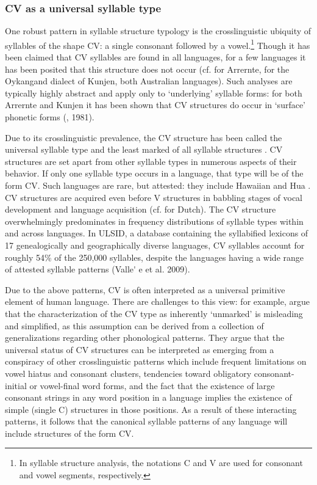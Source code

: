 \subsubsection{{CV} {as} {a} {universal} {syllable} {type}}\label{sec:1.1.2.1}

\textsf{} One robust pattern in syllable structure typology is the crosslinguistic ubiquity of syllables of the shape CV: a single consonant followed by a vowel.\footnote{{In syllable structure analysis, the notations C and V are used for consonant and vowel segments, respectively.}} Though it has been claimed that CV syllables are found in all languages, for a few languages it has been posited that this structure does not occur (cf. \citealt{BreenPensalfini1999} for Arrernte, \citealt{Sommer1969} for the Oykangand dialect of Kunjen, both Australian languages). Such analyses are typically highly abstract and apply only to ‘underlying’ syllable forms: for both Arrernte and Kunjen it has been shown that CV structures do occur in ‘surface’ phonetic forms (\citealt{Anderson2000,Sommer1969}, 1981).

  Due to its crosslinguistic prevalence, the CV structure has been called the universal syllable type and the least marked of all syllable structures \citep{Zec2007}. CV structures are set apart from other syllable types in numerous aspects of their behavior. If only one syllable type occurs in a language, that type will be of the form CV. Such languages are rare, but attested: they include Hawaiian \citep{Maddieson2011} and Hua \citep{Blevins1995}. CV structures are acquired even before V structures in babbling stages of vocal development and language acquisition (cf. \citealt{LeveltEtAl2000} for Dutch). The CV structure overwhelmingly predominates in frequency distributions of syllable types within and across languages. In ULSID, a database containing the syllabified lexicons of 17 genealogically and geographically diverse languages, CV syllables account for roughly 54\% of the 250,000 syllables, despite the languages having a wide range of attested syllable patterns (Valle\'{} e et al. 2009).

  Due to the above patterns, CV is often interpreted as a universal primitive element of human language. There are challenges to this view: for example, \citet{BellHooper1978} argue that the characterization of the CV type as inherently ‘unmarked’ is misleading and simplified, as this assumption can be derived from a collection of generalizations regarding other phonological patterns. They argue that the universal status of CV structures can be interpreted as emerging from a conspiracy of other crosslinguistic patterns which include frequent limitations on vowel hiatus and consonant clusters, tendencies toward obligatory consonant-initial or vowel-final word forms, and the fact that the existence of large consonant strings in any word position in a language implies the existence of simple (single C) structures in those positions. As a result of these interacting patterns, it follows that the canonical syllable patterns of any language will include structures of the form CV.

